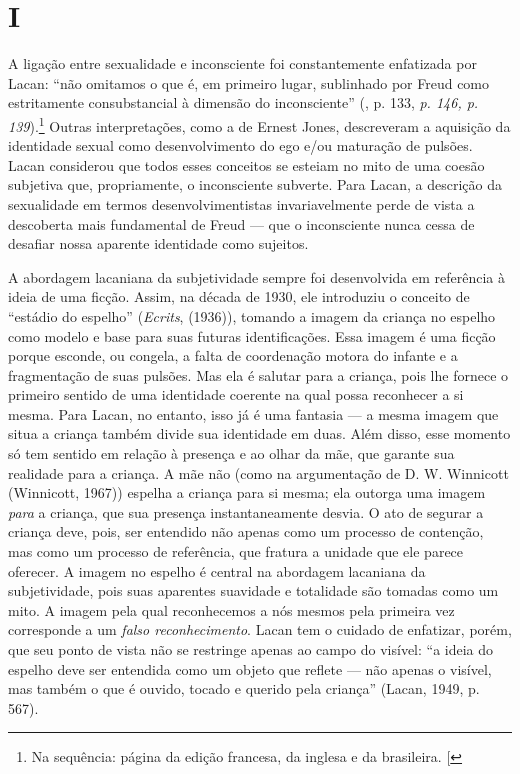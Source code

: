 \section{I}

A ligação entre sexualidade e inconsciente foi constantemente enfatizada
por Lacan: ``não omitamos o que é, em primeiro lugar, sublinhado por
Freud como estritamente consubstancial à dimensão do inconsciente''
(, p. 133, \emph{p. 146, p. 139}).\footnote{Na sequência: página da
  edição francesa, da inglesa e da brasileira. {[}\versal{N.~T.}{]}} Outras
interpretações, como a de Ernest Jones, descreveram a aquisição da
identidade sexual como desenvolvimento do ego e/ou maturação de pulsões.
Lacan considerou que todos esses conceitos se esteiam no mito de uma
coesão subjetiva que, propriamente, o inconsciente subverte. Para Lacan,
a descrição da sexualidade em termos desenvolvimentistas invariavelmente
perde de vista a descoberta mais fundamental de Freud --- que o
inconsciente nunca cessa de desafiar nossa aparente identidade como
sujeitos.

A abordagem lacaniana da subjetividade sempre foi desenvolvida em
referência à ideia de uma ficção. Assim, na década de 1930, ele
introduziu o conceito de ``estádio do espelho'' (\emph{Ecrits}, (1936)),
tomando a imagem da criança no espelho como modelo e base para suas
futuras identificações. Essa imagem é uma ficção porque esconde, ou
congela, a falta de coordenação motora do infante e a fragmentação de
suas pulsões. Mas ela é salutar para a criança, pois lhe fornece o
primeiro sentido de uma identidade coerente na qual possa reconhecer a
si mesma. Para Lacan, no entanto, isso já é uma fantasia --- a mesma
imagem que situa a criança também divide sua identidade em duas. Além
disso, esse momento só tem sentido em relação à presença e ao olhar da
mãe, que garante sua realidade para a criança. A mãe não (como na
argumentação de D. W. Winnicott (Winnicott, 1967)) espelha a criança
para si mesma; ela outorga uma imagem \emph{para} a criança, que sua
presença instantaneamente desvia. O ato de segurar a criança deve, pois,
ser entendido não apenas como um processo de contenção, mas como um
processo de referência, que fratura a unidade que ele parece oferecer. A
imagem no espelho é central na abordagem lacaniana da subjetividade,
pois suas aparentes suavidade e totalidade são tomadas como um mito. A
imagem pela qual reconhecemos a nós mesmos pela primeira vez corresponde
a um \emph{falso reconhecimento}. Lacan tem o cuidado de enfatizar,
porém, que seu ponto de vista não se restringe apenas ao campo do
visível: ``a ideia do espelho deve ser entendida como um objeto que
reflete --- não apenas o visível, mas também o que é ouvido, tocado e
querido pela criança'' (Lacan, 1949, p. 567).

